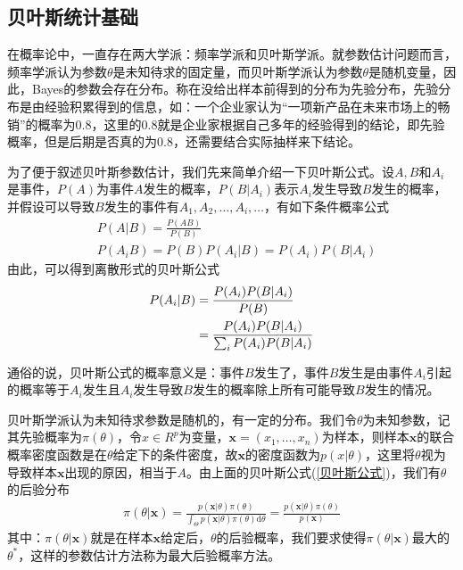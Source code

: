     \subsection{贝叶斯统计基础}
        \par
        在概率论中，一直存在两大学派：频率学派和贝叶斯学派。就参数估计问题而言，频率学派认为参数$\theta$是未知待求的固定量，而贝叶斯学派认为参数$\theta$是随机变量，因此，Bayes的参数会存在分布。称在没给出样本前得到的分布为先验分布，先验分布是由经验积累得到的信息，如：一个企业家认为“一项新产品在未来市场上的畅销”的概率为0.8，这里的0.8就是企业家根据自己多年的经验得到的结论，即先验概率，但是后期是否真的为0.8，还需要结合实际抽样来下结论。
        \par
        为了便于叙述贝叶斯参数估计，我们先来简单介绍一下贝叶斯公式。设$A,B$和$A_i$是事件，$P(A)$为事件$A$发生的概率，$P(B|A_i)$表示$A_i$发生导致$B$发生的概率，并假设可以导致$B$发生的事件有$A_1,A_2,\dots,A_i,\dots$，有如下条件概率公式
        \begin{align*}
        &P(A|B) = \frac{P(AB)}{P(B)}\\
        &P(A_iB) = P(B)P(A_i|B) = P(A_i)P(B|A_i)
        \end{align*}
        由此，可以得到离散形式的贝叶斯公式
        \begin{align}
        \label{贝叶斯公式}
        P(A_i|B) &= \frac{P(A_i)P(B|A_i)}{P(B)} \notag\\
        &= \frac{P(A_i)P(B|A_i)}{\sum_iP(A_i)P(B|A_i)}
        \end{align}
        \par
        通俗的说，贝叶斯公式的概率意义是：事件$B$发生了，事件$B$发生是由事件$A_i$引起的概率等于$A_i$发生且$A_i$发生导致$B$发生的概率除上所有可能导致$B$发生的情况。
        \par
        贝叶斯学派认为未知待求参数是随机的，有一定的分布。我们令$\theta$为未知参数，记其先验概率为$\pi(\theta)$，令$x\in R^p$为变量，$\mathbf{x} = (x_1,\dots,x_n)$为样本，则样本$\mathbf{x}$的联合概率密度函数是在$\theta$给定下的条件密度，故$\mathbf{x}$的密度函数为$p(x|\theta)$，这里将$\theta$视为导致样本$\mathbf{x}$出现的原因，相当于$A$。由上面的贝叶斯公式(\ref{贝叶斯公式})，我们有$\theta$的后验分布
        \begin{align}
        \label{参数的后验分布}
        \pi(\theta|\mathbf{x}) = \frac{p(\mathbf{x}|\theta)\pi(\theta)}{\int_\Theta p(\mathbf{x}|\theta)\pi (\theta) \mathrm{d}\theta} = \frac{p(\mathbf{x}|\theta)\pi(\theta)}{p(\mathbf{x})}
        \end{align}
        其中：$\pi(\theta|\mathbf{x})$就是在样本$\mathbf{x}$给定后，$\theta$的后验概率，我们要求使得$\pi(\theta|\mathbf{x})$最大的$\theta^*$，这样的参数估计方法称为最大后验概率方法。
